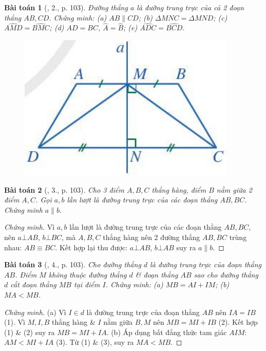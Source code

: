 \documentclass{article}
\newtheorem{baitoan}{Bài toán}
\begin{document}
\begin{baitoan}[\cite{SGK_Toan_7_Canh_Dieu_tap_2}, 2., p. 103]
	Đường thẳng $a$ là đường trung trực của cả 2 đoạn thẳng $AB,CD$. Chứng minh: (a) $AB\parallel CD$; (b) $\Delta MNC = \Delta MND$; (c) $\widehat{AMD} = \widehat{BMC}$; (d) $AD = BC$, $\widehat{A} = \widehat{B}$; (e) $\widehat{ADC} = \widehat{BCD}$.
	\begin{figure}[H]
		\centering
		\includegraphics[scale=.3]{SGK_Toan_7_CD_95}
	\end{figure}
\end{baitoan}

\begin{baitoan}[\cite{SGK_Toan_7_Canh_Dieu_tap_2}, 3., p. 103]
	Cho 3 điểm $A,B,C$ thẳng hàng, điểm $B$ nằm giữa 2 điểm $A,C$. Gọi $a,b$ lần lượt là đường trung trực của các đoạn thẳng $AB,BC$. Chứng minh $a\parallel b$.
\end{baitoan}

\begin{proof}[Chứng minh]
	Vì $a,b$ lần lượt là đường trung trực của các đoạn thẳng $AB,BC$, nên $a\bot AB$, $b\bot BC$, mà $A,B,C$ thẳng hàng nên 2 đường thẳng $AB,BC$ trùng nhau: $AB\equiv BC$. Kết hợp lại thu được: $a\bot AB$, $b\bot AB$ suy ra $a\parallel b$.
\end{proof}

\begin{baitoan}[\cite{SGK_Toan_7_Canh_Dieu_tap_2}, 4., p. 103]
	Cho đường thẳng $d$ là đường trung trực của đoạn thẳng $AB$. Điểm $M$ không thuộc đường thẳng $d$ \& đoạn thẳng $AB$ sao cho đường thẳng $d$ cắt đoạn thẳng $MB$ tại điểm $I$. Chứng minh: (a) $MB = AI + IM$; (b) $MA < MB$.
\end{baitoan}

\begin{proof}[Chứng minh]
	(a) Vì $I\in d$ là đường trung trực của đoạn thẳng $AB$ nên $IA = IB$ (1). Vì $M,I,B$ thẳng hàng \& $I$ nằm giữa $B,M$ nên $MB = MI + IB$ (2). Kết hợp (1) \& (2) suy ra $MB = MI + IA$. (b) Áp dụng bất đẳng thức tam giác $AIM$: $AM < MI + IA$ (3). Từ (1) \& (3), suy ra $MA < MB$.
\end{proof}
\end{document}
